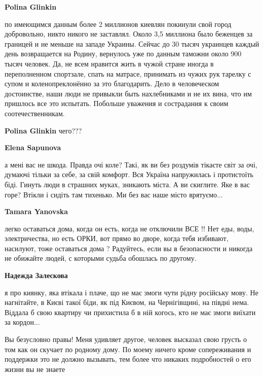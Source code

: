 \begin{itemize}
\begin{itemize}
\textbf{Polina Glinkin} 

по имеющимся данным более 2 миллионов киевлян покинули свой город добровольно,
никто никого не заставлял. Около 3,5 миллиона было беженцев за границей и не
меньше на западе Украины. Сейчас до 30 тысяч украинцев каждый день возвращается
на Родину, вернулось уже по данным таможни около 900 тысяч человек. Да, не
всем нравится жить в чужой стране иногда в переполненном спортзале, спать на
матрасе, принимать из чужих рук тарелку с супом и коленопреклонённо за это
благодарить. Дело в человеческом достоинстве, наши люди не привыкли быть
нахлебниками и не их вина, что им пришлось все это испытать. Побольше уважения
и сострадания к своим соотечественникам.

\textbf{Polina Glinkin} чего???

\textbf{Elena Sapunova} 

а мені вас не шкода. Правда очі коле? Такі, як ви без роздумів тікаєте світ за
очі, думаючі тільки за себе, за свій комфорт. Вся Україна напружилась і
протистоїть біді. Гинуть люди в страшних муках, зникають міста. А ви скиглите.
Яке в вас горе? Втікли і сидіть там тихенько. Ми без вас наше місто врятуємо...

\begin{itemize} %
\textbf{Tamara Yanovska} 

легко оставаться дома, когда он есть, когда не отключили ВСЕ !! Нет еды, воды,
электричества, но есть ОРКИ, вот прямо во дворе, когда тебя избивают,
насилуют, тоже оставаться дома ? Радуйтесь, если вы в безопасности и никогда не
обижайте людей, с которыми судьба обошлась по другому.

\textbf{Надежда Залескова} 

я про киянку, яка втікала і плаче, що не має змоги чути рідну російську мову.
Не нагнітайте, в Києві такої біди, як під Києвом, на Чернігівщині, на півдні
нема. Віддала б свою квартиру чи прихистила б в ній когось, кто не має змоги
виїхати за кордон...

\end{itemize} %


Вы безусловно правы! Меня удивляет другое, человек высказал свою грусть о том
как он скучает по родному дому. По моему ничего кроме сопереживания и поддержки
это не должно вызывать, тем более что никаких подробностей о его жизни вы не
знаете


\end{itemize}
\end{itemize}

